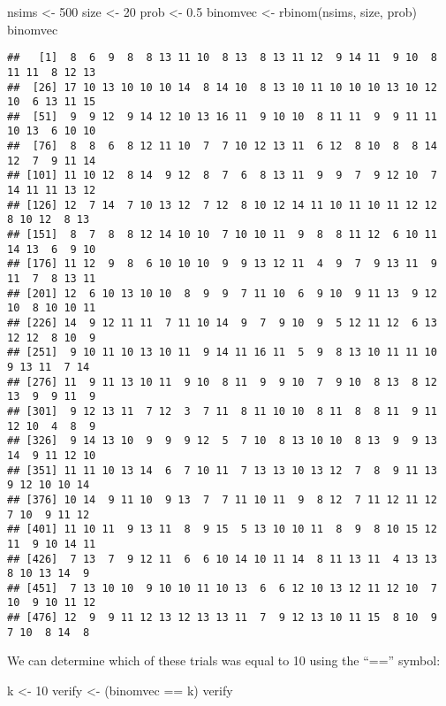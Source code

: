 \documentclass[
]{book}
\newenvironment{Shaded}{\begin{snugshade}}{\end{snugshade}}
\newcommand{\DecValTok}[1]{\textcolor[rgb]{0.00,0.00,0.81}{#1}}
\newcommand{\FloatTok}[1]{\textcolor[rgb]{0.00,0.00,0.81}{#1}}
\newcommand{\FunctionTok}[1]{\textcolor[rgb]{0.00,0.00,0.00}{#1}}
\newcommand{\NormalTok}[1]{#1}
\newcommand{\OtherTok}[1]{\textcolor[rgb]{0.56,0.35,0.01}{#1}}
\newcommand{\SpecialCharTok}[1]{\textcolor[rgb]{0.00,0.00,0.00}{#1}}
\begin{document}
\begin{Shaded}
\begin{Highlighting}[]
\NormalTok{nsims }\OtherTok{\textless{}{-}} \DecValTok{500}
\NormalTok{size }\OtherTok{\textless{}{-}} \DecValTok{20}
\NormalTok{prob }\OtherTok{\textless{}{-}} \FloatTok{0.5}
\NormalTok{binomvec }\OtherTok{\textless{}{-}} \FunctionTok{rbinom}\NormalTok{(nsims, size, prob)}
\NormalTok{binomvec}
\end{Highlighting}
\end{Shaded}

\begin{verbatim}
##   [1]  8  6  9  8  8 13 11 10  8 13  8 13 11 12  9 14 11  9 10  8 11 11  8 12 13
##  [26] 17 10 13 10 10 10 14  8 14 10  8 13 10 11 10 10 10 13 10 12 10  6 13 11 15
##  [51]  9  9 12  9 14 12 10 13 16 11  9 10 10  8 11 11  9  9 11 11 10 13  6 10 10
##  [76]  8  8  6  8 12 11 10  7  7 10 12 13 11  6 12  8 10  8  8 14 12  7  9 11 14
## [101] 11 10 12  8 14  9 12  8  7  6  8 13 11  9  9  7  9 12 10  7 14 11 11 13 12
## [126] 12  7 14  7 10 13 12  7 12  8 10 12 14 11 10 11 10 11 12 12  8 10 12  8 13
## [151]  8  7  8  8 12 14 10 10  7 10 10 11  9  8  8 11 12  6 10 11 14 13  6  9 10
## [176] 11 12  9  8  6 10 10 10  9  9 13 12 11  4  9  7  9 13 11  9 11  7  8 13 11
## [201] 12  6 10 13 10 10  8  9  9  7 11 10  6  9 10  9 11 13  9 12 10  8 10 10 11
## [226] 14  9 12 11 11  7 11 10 14  9  7  9 10  9  5 12 11 12  6 13 12 12  8 10  9
## [251]  9 10 11 10 13 10 11  9 14 11 16 11  5  9  8 13 10 11 11 10  9 13 11  7 14
## [276] 11  9 11 13 10 11  9 10  8 11  9  9 10  7  9 10  8 13  8 12 13  9  9 11  9
## [301]  9 12 13 11  7 12  3  7 11  8 11 10 10  8 11  8  8 11  9 11 12 10  4  8  9
## [326]  9 14 13 10  9  9  9 12  5  7 10  8 13 10 10  8 13  9  9 13 14  9 11 12 10
## [351] 11 11 10 13 14  6  7 10 11  7 13 13 10 13 12  7  8  9 11 13  9 12 10 10 14
## [376] 10 14  9 11 10  9 13  7  7 11 10 11  9  8 12  7 11 12 11 12  7 10  9 11 12
## [401] 11 10 11  9 13 11  8  9 15  5 13 10 10 11  8  9  8 10 15 12 11  9 10 14 11
## [426]  7 13  7  9 12 11  6  6 10 14 10 11 14  8 11 13 11  4 13 13  8 10 13 14  9
## [451]  7 13 10 10  9 10 10 11 10 13  6  6 12 10 13 12 11 12 10  7 10  9 10 11 12
## [476] 12  9  9 11 12 13 12 13 13 11  7  9 12 13 10 11 15  8 10  9  7 10  8 14  8
\end{verbatim}

We can determine which of these trials was equal to 10 using the ``=='' symbol:

\begin{Shaded}
\begin{Highlighting}[]
\NormalTok{k }\OtherTok{\textless{}{-}} \DecValTok{10}
\NormalTok{verify }\OtherTok{\textless{}{-}}\NormalTok{ (binomvec }\SpecialCharTok{==}\NormalTok{ k)}
\NormalTok{verify}
\end{Highlighting}
\end{Shaded}
\end{document}
